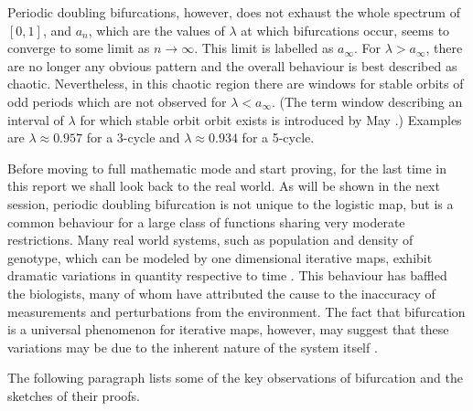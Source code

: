Periodic doubling bifurcations, however, does not exhaust the whole spectrum of $[0,1]$, and $a_{n}$, which are the values of $\lambda$ at which bifurcations occur, seems to converge to some limit as $n \rightarrow \infty$. 
This limit is labelled as $a_{\infty}$.
For $\lambda > a_{\infty}$, there are no longer any obvious pattern and the overall behaviour is best described as chaotic. 
Nevertheless, in this chaotic region there are windows for stable orbits of odd periods which are not observed for $\lambda < a_{\infty}$. (The term window describing an interval of $\lambda$ for which stable orbit orbit exists is introduced by May \cite{May_Nature}.)
Examples are $\lambda \approx 0.957$ for a 3-cycle and $\lambda \approx 0.934$ for a 5-cycle.

Before moving to full mathematic mode and start proving, for the last time in this report we shall look back to the real world. 
As will be shown in the next session, periodic doubling bifurcation is not unique to the logistic map, but is a common behaviour for a large class of functions sharing very moderate restrictions. 
Many real world systems, such as population and density of genotype, which can be modeled by one dimensional iterative maps, exhibit dramatic variations in quantity respective to time \cite{colorado_potato_beetle}.
This behaviour has baffled the biologists, many of whom have attributed the cause to the inaccuracy of measurements and perturbations from the environment. 
The fact that bifurcation is a universal phenomenon for iterative maps, however, may suggest that these variations may be due to the inherent nature of the system itself \cite{genotype}.


The following paragraph lists some of the key observations of bifurcation and the sketches of their proofs.

